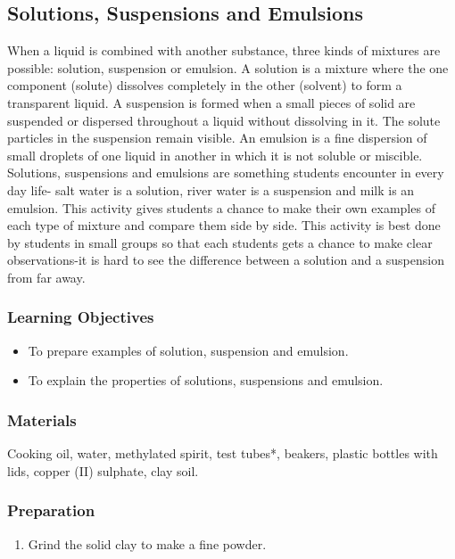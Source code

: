 \subsection{Solutions, Suspensions and Emulsions}
When a liquid is combined with another substance, three kinds of mixtures are possible: solution, suspension or emulsion. 
A solution is a mixture where the one component (solute) dissolves completely in the other (solvent) to form a transparent liquid. A suspension is formed when a small pieces of solid are suspended or dispersed throughout a liquid without dissolving in it. The solute particles in the suspension remain visible.  An emulsion is a fine dispersion of small droplets of one liquid in another in which it is not soluble or miscible. 
Solutions, suspensions and emulsions are something students encounter in every day life- salt water is a solution, river water is a suspension and milk is an emulsion.
This activity gives students a chance to make their own examples of each type of mixture and compare them side by side. This activity is best done by students in small groups so that each students gets a chance to make clear observations-it is hard to see the difference between a solution and a suspension from far away.

\subsubsection*{Learning Objectives}
\begin{itemize}
\item{To prepare examples of solution, suspension and emulsion.}
\item{To explain the properties of solutions, suspensions and emulsion.}
\end{itemize}

\subsubsection*{Materials}
Cooking oil, water, methylated spirit, test tubes*, beakers, plastic bottles with lids, copper (II) sulphate, clay soil.

\subsubsection*{Preparation}
\begin{enumerate}
\item{Grind the solid clay to make a fine powder.}
\end{enumerate}

